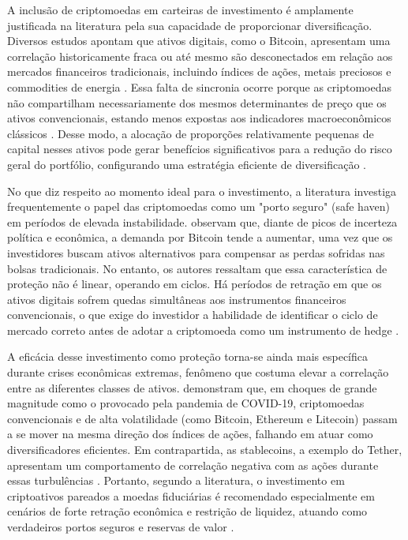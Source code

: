 A inclusão de criptomoedas em carteiras de investimento é amplamente justificada na literatura pela sua capacidade de proporcionar diversificação. Diversos estudos apontam que ativos digitais, como o Bitcoin, apresentam uma correlação historicamente fraca ou até mesmo são desconectados em relação aos mercados financeiros tradicionais, incluindo índices de ações, metais preciosos e commodities de energia \cite{ahmed2020risk,charfeddine2020investigating}. Essa falta de sincronia ocorre porque as criptomoedas não compartilham necessariamente dos mesmos determinantes de preço que os ativos convencionais, estando menos expostas aos indicadores macroeconômicos clássicos \cite{charfeddine2020investigating}. Desse modo, a alocação de proporções relativamente pequenas de capital nesses ativos pode gerar benefícios significativos para a redução do risco geral do portfólio, configurando uma estratégia eficiente de diversificação \cite{charfeddine2020investigating}.

No que diz respeito ao momento ideal para o investimento, a literatura investiga frequentemente o papel das criptomoedas como um "porto seguro" (safe haven) em períodos de elevada instabilidade.  observam que, diante de picos de incerteza política e econômica, a demanda por Bitcoin tende a aumentar, uma vez que os investidores buscam ativos alternativos para compensar as perdas sofridas nas bolsas tradicionais. No entanto, os autores ressaltam que essa característica de proteção não é linear, operando em ciclos. Há períodos de retração em que os ativos digitais sofrem quedas simultâneas aos instrumentos financeiros convencionais, o que exige do investidor a habilidade de identificar o ciclo de mercado correto antes de adotar a criptomoeda como um instrumento de hedge \cite{umar2021bitcoin}.

A eficácia desse investimento como proteção torna-se ainda mais específica durante crises econômicas extremas, fenômeno que costuma elevar a correlação entre as diferentes classes de ativos.  demonstram que, em choques de grande magnitude como o provocado pela pandemia de COVID-19, criptomoedas convencionais e de alta volatilidade (como Bitcoin, Ethereum e Litecoin) passam a se mover na mesma direção dos índices de ações, falhando em atuar como diversificadores eficientes. Em contrapartida, as stablecoins, a exemplo do Tether, apresentam um comportamento de correlação negativa com as ações durante essas turbulências \cite{goodell2021diversifying}. Portanto, segundo a literatura, o investimento em criptoativos pareados a moedas fiduciárias é recomendado especialmente em cenários de forte retração econômica e restrição de liquidez, atuando como verdadeiros portos seguros e reservas de valor \cite{goodell2021diversifying}.


